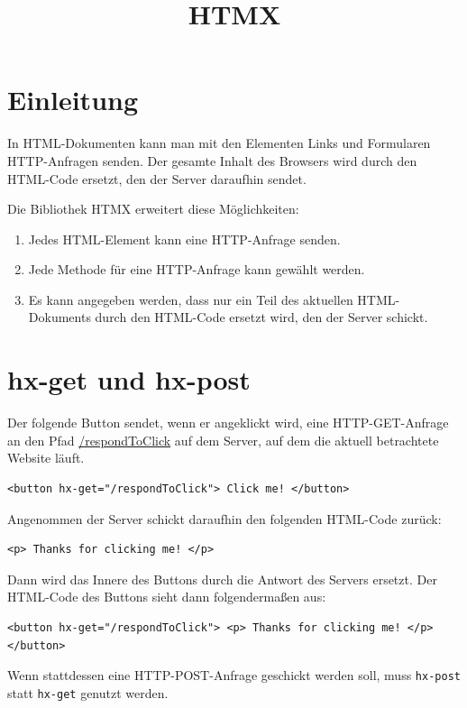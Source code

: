 \documentclass[a4paper]{scrartcl}
\date{}
\title{HTMX}
\begin{document}
\maketitle
\section{Einleitung}\label{sec: einleitung}


In HTML-Dokumenten kann man mit den Elementen Links und Formularen HTTP-Anfragen senden.
Der gesamte Inhalt des Browsers wird durch den HTML-Code ersetzt, den der Server daraufhin sendet.


Die Bibliothek HTMX erweitert diese Möglichkeiten:
\begin{enumerate}
    \item Jedes HTML-Element kann eine HTTP-Anfrage senden.
    \item Jede Methode für eine HTTP-Anfrage kann gewählt werden.
    \item Es kann angegeben werden, dass nur ein Teil des aktuellen HTML-Dokuments durch den HTML-Code ersetzt wird, den der Server schickt.
\end{enumerate}

\section{hx-get und hx-post}\label{sec:hx-get-und-hx-post}


Der folgende Button sendet, wenn er angeklickt wird, eine HTTP-GET-Anfrage an den Pfad \url{/respondToClick} auf dem Server, auf dem die aktuell betrachtete Website läuft.

\begin{verbatim}
<button hx-get="/respondToClick"> Click me! </button>
\end{verbatim}

Angenommen der Server schickt daraufhin den folgenden HTML-Code zurück:

\begin{verbatim}
<p> Thanks for clicking me! </p>
\end{verbatim}

Dann wird das Innere des Buttons durch die Antwort des Servers ersetzt.
Der HTML-Code des Buttons sieht dann folgendermaßen aus:
\begin{verbatim}
<button hx-get="/respondToClick"> <p> Thanks for clicking me! </p> </button>
\end{verbatim}

Wenn stattdessen eine HTTP-POST-Anfrage geschickt werden soll, muss \texttt{hx-post} statt \texttt{hx-get} genutzt werden.
\end{document}
